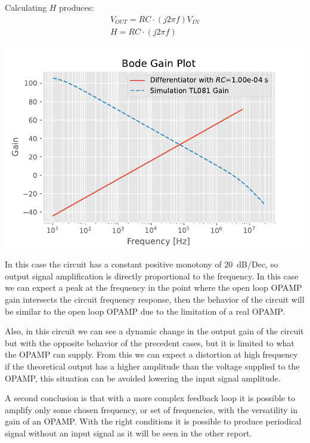 \documentclass[a4paper, twocolumn]{article}
\begin{document}
Calculating \(H\) produces:
\begin{gather}
    V_{OUT}=RC\cdot(j2\pi f)V_{IN}\\
    H = RC\cdot(j2\pi f)
\end{gather}

\begin{center}
    \includegraphics[width=\columnwidth]{def_graph/DifferentiatorBodeTheo.pdf}
    \label{fig:DiffBodeGraphTheo}
\end{center}

In this case the circuit has a constant positive monotony of \SI{20}{\deci\bel/Dec}, so output signal amplification is directly proportional to the frequency. In this case we can expect a peak at the frequency in the point where the open loop OPAMP gain intersects the circuit frequency response, then the behavior of the circuit will be similar to the open loop OPAMP due to the limitation of a real OPAMP.

Also, in this circuit we can see a dynamic change in the output gain of the circuit but with the opposite behavior of the precedent cases, but it is limited to what the OPAMP can supply. From this we can expect a distortion at high frequency if the theoretical output has a higher amplitude than the  voltage supplied to the OPAMP, this situation can be avoided lowering the input signal amplitude. 

A second  conclusion is that with a more complex feedback loop it is possible to amplify only some chosen frequency, or set of frequencies,  with the versatility in gain of an OPAMP. With the right conditions it is possible to produce periodical signal without an input signal as it will be seen in the other report.
\end{document}
